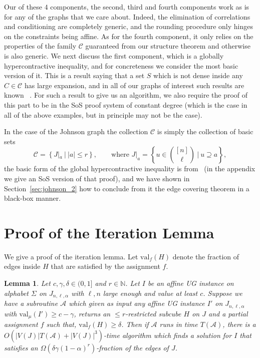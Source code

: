 \documentclass[11pt]{article}
\newcommand\skipi{{\vskip 10pt}}
\def \cA {\mathcal{A}}
\def \nn {\mathbb{N}}
\def \sos {SoS\xspace}
\def \val {\mathrm{val}}
\newtheorem{lemma}[theorem]{Lemma}
\theoremstyle{definition}
\begin{document}
Our of these $4$ components, the second, third and 
fourth components work as is for any of the graphs that we 
care about. Indeed, the elimination of correlations and 
conditioning are completely generic, and the rounding 
procedure only hinges on the constraints being affine. 
As for the fourth component, it only relies on the properties
of the family $\mathcal{C}$ guaranteed from our structure 
theorem and otherwise is also generic.
\skipi
We next discuss the first component, which is a globally 
hypercontractive inequality, and for concreteness we 
consider the most basic version of it. This is a result
saying that a set $S$ which is not dense inside any 
$C\in \mathcal{C}$ has large expansion, and in 
all of our graphs of interest such results are known
~\cite{KMMS,KhotMS18,filmus2020hypercontractivity,keevash2021global,bafna2022hypercontractivity,gur2022hypercontractivity}. 
For such a result to give us an algorithm, we also require 
the proof of this part to be in the \sos proof system of
constant degree (which is the case in all of the above
examples, but in principle may not be the case). 

In the case of the Johnson graph the collection 
$\mathcal{C}$ is simply the collection of basic sets 
\[
\mathcal{C} = \left\{J|_a ~|~|a|\leq r\right\},
\qquad
\text{where }
J|_a = \left\{u\in\binom{[n]}{\ell}~\Big|~u\supseteq a\right\},
\]
the basic form of the global hypercontractive inequality is 
from~\cite{KMMS} (in the appendix we give an \sos version of 
that proof), and we have shown in Section~\ref{sec:johnson_2} how to conclude from it the edge covering theorem in a black-box manner.


\appendix

\section{Proof of the Iteration Lemma}\label{sec:pf_it}
We give a proof of the iteration lemma. Let $\val_f(H)$ denote the fraction of edges inside $H$ that are satisfied by the assignment $f$.

\begin{lemma}\label{lem:subroutine-restated}
Let $c,\gamma,\delta \in (0,1]$ and $r \in \nn$. Let $I$ be an affine UG instance on alphabet $\Sigma$ on $J_{n,\ell,\alpha}$ with $\ell, n$ large enough  and value at least $c$. 
Suppose we have a subroutine $\cA$ which given as input any affine UG instance $I'$ on $J_{n,\ell,\alpha}$ with $\val_\mu(I') \ge c-\gamma$, returns an $\leq r$-restricted subcube $H$ on $J$ and a partial assignment $f$ such that, $\text{val}_{f}(H) \geq \delta$.
Then if $\cA$ runs in time $T(\cA)$, there is a $O(|V(J)|T(\cA)+|V(J)|^3)$-time algorithm which finds a solution for $I$ that satisfies an $\Omega(\delta\gamma(1-\alpha)^r)$-fraction of the  edges of $J$. 
\end{lemma}
\end{document}
